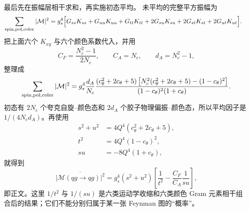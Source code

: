 \begin{derivation}
最后先在振幅层相干求和，再实施初态平均。
未平均的完整平方振幅为
\begin{align*}
 \sum_{\rm spin,pol,color}|\mathcal M|^2
 =g_s^4\Bigl[&
 G_{ss}K_{ss}+G_{uu}K_{uu}+G_{tt}K_{tt}
 +2G_{su}K_{su}+2G_{st}K_{st}+2G_{ut}K_{ut}
 \Bigr].
\end{align*}
把上面六个 $K_{xy}$ 与六个颜色系数代入，并用
\begin{equation*}
 C_F=\frac{N_c^2-1}{2N_c},
 \qquad C_A=N_c,
 \qquad d_A=N_c^2-1,
\end{equation*}
整理成
\begin{equation*}
 \sum_{\rm spin,pol,color}|\mathcal M|^2
 =g_s^4\frac{d_A}{N_c}
 \frac{(c_\theta^2+2c_\theta+5)
 \left[N_c^2(c_\theta^2+2c_\theta+5)-(1-c_\theta)^2\right]}
 {(1-c_\theta)^2(1+c_\theta)}.
\end{equation*}
初态有 $2N_c$ 个夸克自旋--颜色态和 $2d_A$ 个胶子物理偏振--颜色态，所以平均因子是 $1/(4N_cd_A)$。再使用
\begin{align*}
 s^2+u^2&=4Q^4(c_\theta^2+2c_\theta+5),\\
 t^2&=4Q^4(1-c_\theta)^2,\\
 su&=-8Q^4(1+c_\theta),
\end{align*}
就得到
\begin{equation*}
 \overline{|\mathcal M(qg\to qg)|^2}
 =g_s^4(s^2+u^2)
 \left[
 \frac1{t^2}-\frac{C_F}{C_A}\frac1{su}
 \right],
\end{equation*}
即正文。这里 $1/t^2$ 与 $1/(su)$ 是六类运动学收缩和六类颜色 Gram 元素相干组合后的结果；它们不能分别归属于某一张 Feynman 图的“概率”。
\end{derivation}

